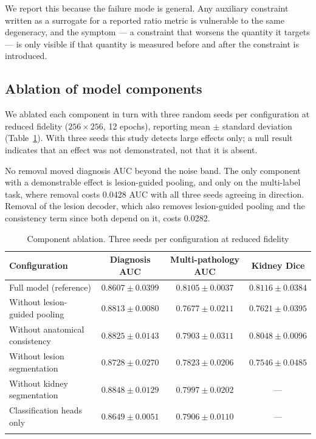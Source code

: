 \documentclass[pdflatex,sn-mathphys-num]{sn-jnl}
\theoremstyle{thmstyleone}%
\theoremstyle{thmstyletwo}%
\theoremstyle{thmstylethree}%
\begin{document}
We report this because the failure mode is general. Any auxiliary constraint written as a
surrogate for a reported ratio metric is vulnerable to the same degeneracy, and the symptom ---
a constraint that worsens the quantity it targets --- is only visible if that quantity is
measured before and after the constraint is introduced.

\subsection{Ablation of model components}\label{subsec:ablation}

We ablated each component in turn with three random seeds per configuration at reduced fidelity
($256 \times 256$, 12 epochs), reporting mean $\pm$ standard deviation
(Table~\ref{tab:ablation}). With three seeds this study detects large effects only; a null
result indicates that an effect was not demonstrated, not that it is absent.

No removal moved diagnosis AUC beyond the noise band. The only component with a demonstrable
effect is lesion-guided pooling, and only on the multi-label task, where removal costs 0.0428
AUC with all three seeds agreeing in direction. Removal of the lesion decoder, which also
removes lesion-guided pooling and the consistency term since both depend on it, costs 0.0282.

\begin{table}[h]
\caption{Component ablation. Three seeds per configuration at reduced fidelity}\label{tab:ablation}%
\begin{tabular*}{\textwidth}{@{\extracolsep\fill}lccc}
\toprule
Configuration & Diagnosis AUC & Multi-pathology AUC & Kidney Dice \\
\midrule
Full model (reference)       & $0.8607 \pm 0.0399$ & $\mathbf{0.8105 \pm 0.0037}$ & $0.8116 \pm 0.0384$ \\
Without lesion-guided pooling & $0.8813 \pm 0.0080$ & $0.7677 \pm 0.0211$ & $0.7621 \pm 0.0395$ \\
Without anatomical consistency & $0.8825 \pm 0.0143$ & $0.7903 \pm 0.0311$ & $0.8048 \pm 0.0096$ \\
Without lesion segmentation   & $0.8728 \pm 0.0270$ & $0.7823 \pm 0.0206$ & $0.7546 \pm 0.0485$ \\
Without kidney segmentation   & $0.8848 \pm 0.0129$ & $0.7997 \pm 0.0202$ & --- \\
Classification heads only     & $0.8649 \pm 0.0051$ & $0.7906 \pm 0.0110$ & --- \\
\botrule
\end{tabular*}
\end{table}
\end{document}
